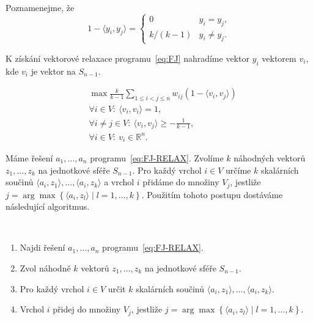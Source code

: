 \noindent Poznamenejme, že
$$
    1 - \langle y_i, y_j \rangle = 
    \begin{cases}
        0           & y_i = y_j, \\
        k / (k - 1) & y_i \neq y_j.
    \end{cases}
$$

\noindent K získání vektorové relaxace programu~\ref{eq:FJ} nahradíme vektor $y_i$ vektorem $v_i$, kde $v_i$ je vektor na $S_{n-1}$.

\begin{equation}\tag{FJ-RELAX}
    \begin{split}
        &\max \frac{k}{k-1} \sum_{1 \leq i < j \leq n} w_{ij} (1 - \langle v_i, v_j \rangle) \\
        &\forall i \in V:\ \langle v_i, v_i \rangle = 1, \\
        &\forall i \neq j \in V:\ \langle v_i, v_j \rangle \geq -\frac{1}{k-1}, \\
        &\forall i \in V:\ v_i \in \mathbb{R}^n.
    \end{split}
    \label{eq:FJ-RELAX}
\end{equation}


Máme řešení $a_1, \dots, a_n$ programu~\ref{eq:FJ-RELAX}. Zvolíme $k$ náhodných vektorů $z_1, \dots, z_k$ na jednotkové sféře $S_{n-1}$. Pro každý vrchol $i \in V$ určíme $k$ skalárních součinů $\langle a_i, z_1 \rangle, \dots, \langle a_i, z_k \rangle$ a vrchol $i$ přidáme do množiny $V_j$, jestliže $j = \arg \max \left\{ \langle a_i, z_l \rangle \mid l = 1, \dots, k \right\}$. Použitím tohoto postupu dostáváme následující algoritmus.

\begin{alg}\cite{frieze-jerrum}$ $
    \begin{enumerate}
        \item Najdi řešení $a_1, \dots, a_n$ programu~\ref{eq:FJ-RELAX}.
        \item Zvol náhodně $k$ vektorů $z_1, \dots, z_k$ na jednotkové sféře $S_{n-1}$.
        \item Pro každý vrchol $i \in V$ určit $k$ skalárních součinů $\langle a_i, z_1 \rangle, \dots, \langle a_i, z_k \rangle$.
        \item Vrchol $i$ přidej do množiny $V_j$, jestliže $j = \arg \max \left\{ \langle a_i, z_l \rangle \mid l = 1, \dots, k \right\}$.
    \end{enumerate}
    \label{alg:fj-max-k-cut}
\end{alg}


